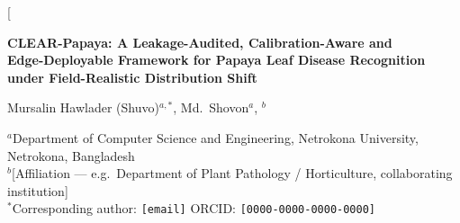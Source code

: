 \documentclass[10pt,twocolumn,a4paper]{article}
\begin{document}
\twocolumn[
\begin{@twocolumnfalse}
\begin{center}
{\LARGE\bfseries CLEAR-Papaya: A Leakage-Audited, Calibration-Aware and\\[3pt]
Edge-Deployable Framework for Papaya Leaf Disease Recognition\\[3pt]
under Field-Realistic Distribution Shift\par}
\vspace{9pt}
{\large Mursalin Hawlader (Shuvo)$^{a,*}$, \quad Md.\ Shovon$^{a}$, $^{b}$\par}
\vspace{5pt}
{\small $^{a}$Department of Computer Science and Engineering, Netrokona University, Netrokona, Bangladesh\\
$^{b}$[Affiliation --- e.g.\ Department of Plant Pathology / Horticulture, collaborating institution]\\
$^{*}$Corresponding author: \texttt{[email]} \quad ORCID: \texttt{[0000-0000-0000-0000]}\par}
\vspace{12pt}


\end{center}
\end{@twocolumnfalse}
\end{document}
